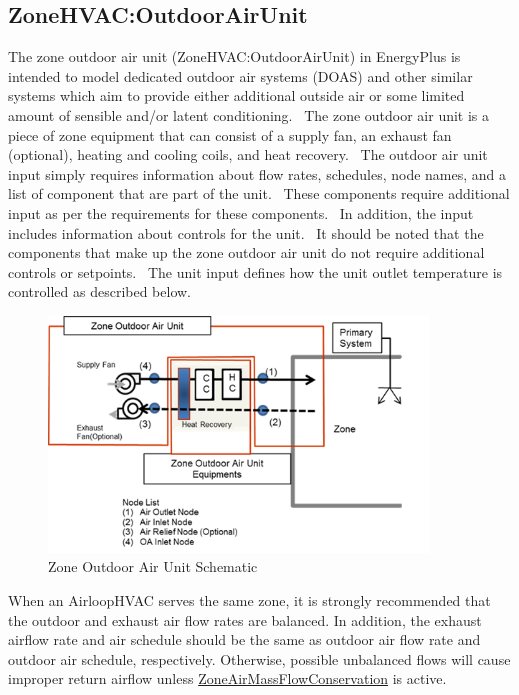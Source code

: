 \subsection{ZoneHVAC:OutdoorAirUnit}\label{zonehvacoutdoorairunit}

The zone outdoor air unit (ZoneHVAC:OutdoorAirUnit) in EnergyPlus is intended to model dedicated outdoor air systems (DOAS) and other similar systems which aim to provide either additional outside air or some limited amount of sensible and/or latent conditioning.~ The zone outdoor air unit is a piece of zone equipment that can consist of a supply fan, an exhaust fan (optional), heating and cooling coils, and heat recovery.~ The outdoor air unit input simply requires information about flow rates, schedules, node names, and a list of component that are part of the unit.~ These components require additional input as per the requirements for these components.~ In addition, the input includes information about controls for the unit.~ It should be noted that the components that make up the zone outdoor air unit do not require additional controls or setpoints.~ The unit input defines how the unit outlet temperature is controlled as described below.

\begin{figure}[hbtp] %
\centering
\includegraphics[width=0.9\textwidth, height=0.9\textheight, keepaspectratio=true]{media/image282.png}
\caption{Zone Outdoor Air Unit Schematic \protect \label{fig:zone-outdoor-air-unit-schematic}}
\end{figure}

When an AirloopHVAC serves the same zone, it is strongly recommended that the outdoor and exhaust air flow rates are balanced. In addition, the exhaust airflow rate and air schedule should be the same as outdoor air flow rate and outdoor air schedule, respectively. Otherwise, possible unbalanced flows will cause improper return airflow unless \hyperref[zoneairmassflowconservation]{ZoneAirMassFlowConservation} is active.

